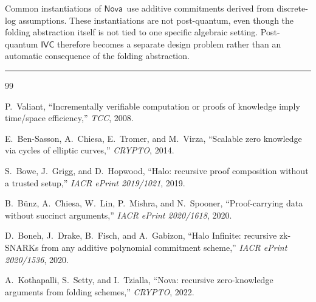 \documentclass[11pt]{article}
\newcommand{\IVC}{\ensuremath{\mathsf{IVC}}}
\newcommand{\Nova}{\ensuremath{\mathsf{Nova}}}
\begin{document}
\begin{remark}
Common instantiations of \Nova\ use additive commitments derived from
discrete-log assumptions.  These instantiations are not post-quantum, even
though the folding abstraction itself is not tied to one specific algebraic
setting.  Post-quantum $\IVC$ therefore becomes a separate design problem rather
than an automatic consequence of the folding abstraction.
\end{remark}

\bigskip
\hrule
\bigskip

\begin{thebibliography}{99}

  P.~Valiant,
  ``Incrementally verifiable computation or proofs of knowledge imply
  time/space efficiency,''
  \emph{TCC}, 2008.

  E.~Ben-Sasson, A.~Chiesa, E.~Tromer, and M.~Virza,
  ``Scalable zero knowledge via cycles of elliptic curves,''
  \emph{CRYPTO}, 2014.

  S.~Bowe, J.~Grigg, and D.~Hopwood,
  ``Halo: recursive proof composition without a trusted setup,''
  \emph{IACR ePrint 2019/1021}, 2019.

  B.~B\"unz, A.~Chiesa, W.~Lin, P.~Mishra, and N.~Spooner,
  ``Proof-carrying data without succinct arguments,''
  \emph{IACR ePrint 2020/1618}, 2020.

  D.~Boneh, J.~Drake, B.~Fisch, and A.~Gabizon,
  ``Halo Infinite: recursive zk-SNARKs from any additive polynomial
  commitment scheme,''
  \emph{IACR ePrint 2020/1536}, 2020.

  A.~Kothapalli, S.~Setty, and I.~Tzialla,
  ``Nova: recursive zero-knowledge arguments from folding schemes,''
  \emph{CRYPTO}, 2022.

\end{thebibliography}
\end{document}
